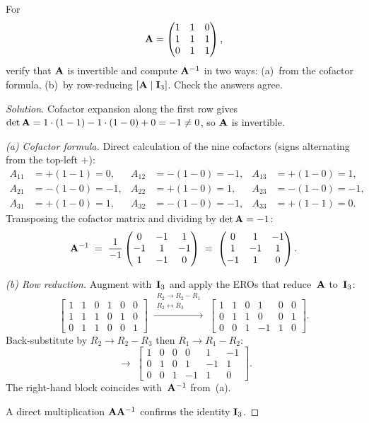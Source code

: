 \begin{problem}
\label{prob:invert-3x3}
For
\[
  \mathbf{A} = \begin{pmatrix}
    1 & 1 & 0 \\
    1 & 1 & 1 \\
    0 & 1 & 1
  \end{pmatrix},
\]
verify that $\mathbf{A}$ is invertible and compute $\mathbf{A}^{-1}$ in two
ways: (a)~from the cofactor formula, (b)~by row-reducing
$[\mathbf{A} \mid \mathbf{I}_3]$. Check the answers agree.
\end{problem}

\begin{proof}[Solution]
Cofactor expansion along the first row gives
$\det \mathbf{A} = 1 \cdot (1 - 1) - 1 \cdot (1 - 0) + 0 = -1 \neq 0$, so
$\mathbf{A}$ is invertible.

\emph{(a) Cofactor formula.} Direct calculation of the nine cofactors
(signs alternating from the top-left $+$):
\[
  \begin{aligned}
    A_{11} &= +(1-1) = 0,
    & A_{12} &= -(1-0) = -1,
    & A_{13} &= +(1-0) = 1, \\
    A_{21} &= -(1-0) = -1,
    & A_{22} &= +(1-0) = 1,
    & A_{23} &= -(1-0) = -1, \\
    A_{31} &= +(1-0) = 1,
    & A_{32} &= -(1-0) = -1,
    & A_{33} &= +(1-1) = 0.
  \end{aligned}
\]
Transposing the cofactor matrix and dividing by $\det \mathbf{A} = -1$:
\[
  \mathbf{A}^{-1} \;=\; \frac{1}{-1}
  \begin{pmatrix} 0 & -1 & 1 \\ -1 & 1 & -1 \\ 1 & -1 & 0 \end{pmatrix}
  \;=\;
  \begin{pmatrix} 0 & 1 & -1 \\ 1 & -1 & 1 \\ -1 & 1 & 0 \end{pmatrix}.
\]

\emph{(b) Row reduction.} Augment with~$\mathbf{I}_3$ and apply the EROs
that reduce~$\mathbf{A}$ to~$\mathbf{I}_3$:
\[
  \left[\begin{array}{rrr|rrr}
    1 & 1 & 0 & 1 & 0 & 0 \\
    1 & 1 & 1 & 0 & 1 & 0 \\
    0 & 1 & 1 & 0 & 0 & 1
  \end{array}\right]
  \;\xrightarrow{\substack{R_2 \to R_2 - R_1 \\ R_2 \leftrightarrow R_3}}\;
  \left[\begin{array}{rrr|rrr}
    1 & 1 & 0 & 1 & 0 & 0 \\
    0 & 1 & 1 & 0 & 0 & 1 \\
    0 & 0 & 1 & -1 & 1 & 0
  \end{array}\right].
\]
Back-substitute by $R_2 \to R_2 - R_3$ then $R_1 \to R_1 - R_2$:
\[
  \;\longrightarrow\;
  \left[\begin{array}{rrr|rrr}
    1 & 0 & 0 & 0 & 1 & -1 \\
    0 & 1 & 0 & 1 & -1 & 1 \\
    0 & 0 & 1 & -1 & 1 & 0
  \end{array}\right].
\]
The right-hand block coincides with~$\mathbf{A}^{-1}$ from~(a).

A direct multiplication $\mathbf{A}\mathbf{A}^{-1}$ confirms the identity
$\mathbf{I}_3$.
\end{proof}

